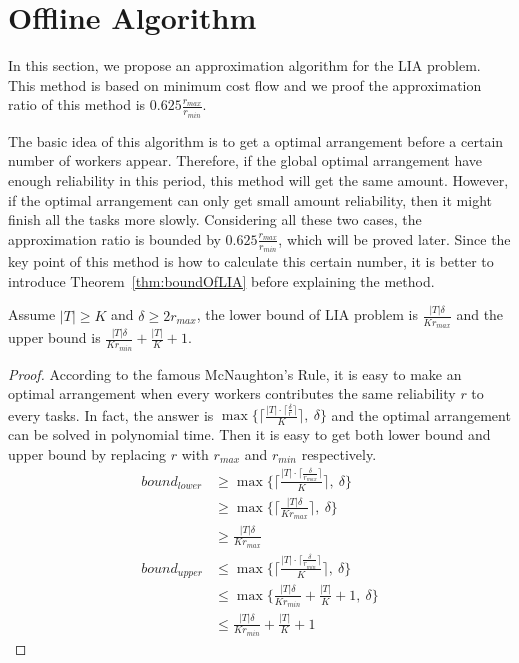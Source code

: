 \section{Offline Algorithm}
\label{sec:offline}
In this section, we propose an approximation algorithm for the LIA problem.
This method is based on minimum cost flow and we proof the approximation ratio of this method is $0.625\frac{r_{max}}{r_{min}}$.

The basic idea of this algorithm is to get a optimal arrangement before a certain number of workers appear.
Therefore, if the global optimal arrangement have enough reliability in this period, this method will get the same amount.
However, if the optimal arrangement can only get small amount reliability, then it might finish all the tasks more slowly.
Considering all these two cases, the approximation ratio is bounded by $0.625\frac{r_{max}}{r_{min}}$, which will be proved later.
Since the key point of this method is how to calculate this certain number, it is better to introduce Theorem~\ref{thm:boundOfLIA} before 
explaining the method.

\begin{theorem}
\label{thm:boundOfLIA}
Assume $|T| \ge K$ and $\delta \ge 2r_{max}$,
the lower bound of LIA problem is $\frac{|T|\delta}{Kr_{max}}$ and the upper bound is $\frac{|T|\delta}{Kr_{min}} + \frac{|T|}{K} + 1$.
\end{theorem}

\begin{proof}
According to the famous McNaughton's Rule\cite{NaughtonRule}, it is easy to make an optimal arrangement when every workers contributes the same reliability $r$ to every tasks.
In fact, the answer is $\max\{\lceil \frac{|T| \cdot \lceil \frac{\delta}{r} \rceil}{K} \rceil,\ \delta\}$ and the optimal arrangement can be solved in polynomial time.
Then it is easy to get both lower bound and upper bound by replacing $r$ with $r_{max}$ and $r_{min}$ respectively.
\begin{align*}
	bound_{lower} &\ge \max\{\lceil \frac{|T| \cdot \lceil \frac{\delta}{r_{max}} \rceil}{K} \rceil,\ \delta\} \\
					&\ge \max\{\lceil \frac{|T|\delta}{Kr_{max}} \rceil,\ \delta \} \\
					&\ge \frac{|T|\delta}{Kr_{max}}  \\
	bound_{upper} &\le \max\{\lceil \frac{|T| \cdot \lceil \frac{\delta}{r_{min}} \rceil}{K} \rceil,\ \delta\} \\
					&\le \max\{ \frac{|T|\delta}{Kr_{min}} + \frac{|T|}{K} + 1,\ \delta \} \\
					&\le \frac{|T|\delta}{Kr_{min}} + \frac{|T|}{K} + 1
\end{align*}
\end{proof}

